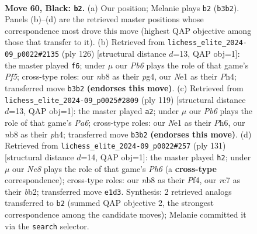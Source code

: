 \documentclass[11pt]{article}
\begin{document}
\clearpage

\begin{figure}[p]\centering
\begin{subfigure}{0.46\textwidth}\centering
\resizebox{\linewidth}{!}{%
\newchessgame
\chessboard[
  setfen={1N6/2R5/3p1k2/8/6pp/1p6/8/4n2K b - - 2 60},
  showmover=false,
  pgfstyle=straightmove, color=movearrow, markmove={b3-b2}
]}
\caption{}
\end{subfigure}\hfill
\begin{subfigure}{0.46\textwidth}\centering
\resizebox{\linewidth}{!}{%
\newchessgame
\chessboard[
  setfen={8/8/8/4PP1n/2k3pP/4K3/8/8 w - - 1 64},
  showmover=false,
  pgfstyle=straightmove, color=movearrow, markmove={f5-f6}
]}
\caption{}
\end{subfigure}
\\[4pt]
\begin{subfigure}{0.46\textwidth}\centering
\resizebox{\linewidth}{!}{%
\newchessgame
\chessboard[
  setfen={5k2/8/1p3K1p/8/7P/pBn5/8/8 b - - 2 60},
  showmover=false,
  pgfstyle=straightmove, color=movearrow, markmove={a3-a2}
]}
\caption{}
\end{subfigure}\hfill
\begin{subfigure}{0.46\textwidth}\centering
\resizebox{\linewidth}{!}{%
\newchessgame
\chessboard[
  setfen={8/8/6k1/8/5p2/5P1p/pB6/5K2 b - - 1 66},
  showmover=false,
  pgfstyle=straightmove, color=movearrow, markmove={h3-h2}
]}
\caption{}
\end{subfigure}
\caption{\textbf{Move 60, Black: \texttt{b2}.} (a) Our position; Melanie plays \texttt{b2} (\texttt{b3b2}). Panels (b)--(d) are the retrieved master positions whose correspondence most drove this move (highest QAP objective among those that transfer to it). (b) Retrieved from \texttt{lichess\_elite\_2024-09\_p0022\#2135} (ply 126) [structural distance $d$=13, QAP obj=1]: the master played \texttt{f6}; under $\mu$ our \emph{Pb6} plays the role of that game's \emph{Pf5}; cross-type roles: our \emph{n}b8 as their \emph{p}g4, our \emph{N}e1 as their \emph{P}h4; transferred move \texttt{b3b2} \textbf{(endorses this move)}. (c) Retrieved from \texttt{lichess\_elite\_2024-09\_p0025\#2809} (ply 119) [structural distance $d$=13, QAP obj=1]: the master played \texttt{a2}; under $\mu$ our \emph{Pb6} plays the role of that game's \emph{Pa6}; cross-type roles: our \emph{N}e1 as their \emph{P}h6, our \emph{n}b8 as their \emph{p}h4; transferred move \texttt{b3b2} \textbf{(endorses this move)}. (d) Retrieved from \texttt{lichess\_elite\_2024-09\_p0022\#257} (ply 131) [structural distance $d$=14, QAP obj=1]: the master played \texttt{h2}; under $\mu$ our \emph{Ne8} plays the role of that game's \emph{Ph6} (a \textbf{cross-type} correspondence); cross-type roles: our \emph{n}b8 as their \emph{P}f4, our \emph{r}c7 as their \emph{b}b2; transferred move \texttt{e1d3}. Synthesis: 2 retrieved analogs transferred to \texttt{b2} (summed QAP objective 2, the strongest correspondence among the candidate moves); Melanie committed it via the \texttt{search} selector.}
\label{fig:thought-m119}
\end{figure}
\end{document}
